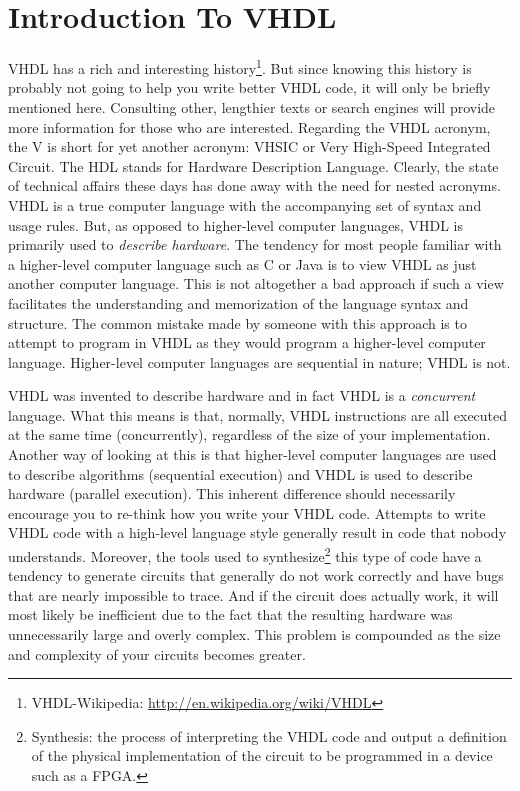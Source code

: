 %
%
%
\chapter{Introduction To VHDL}
VHDL has a rich and interesting history\footnote{VHDL-Wikipedia: {\footnotesize\url{http://en.wikipedia.org/wiki/VHDL}}}. But since knowing this history is probably not going to help you write better VHDL code, it will only be briefly mentioned here. Consulting other, lengthier texts or search engines will provide more information for those who are interested. Regarding the VHDL acronym,  the V is short for yet another acronym: VHSIC or Very High-Speed Integrated Circuit. The HDL stands for Hardware Description Language. Clearly, the state of technical affairs these days has done away with the need for nested acronyms. VHDL is a true computer language with the accompanying set of syntax and usage rules. But, as opposed to higher-level computer languages, VHDL is primarily used  to \textit{describe hardware}. The tendency for most people familiar with a higher-level computer language such as C or Java is to view VHDL as just another computer language. This is not altogether a bad approach if such a view facilitates the understanding and memorization of the language syntax and structure. The common mistake made by someone with this approach is to attempt to program in VHDL as they would program a higher-level computer language. Higher-level computer languages are sequential in nature; VHDL is not. 

VHDL was invented to describe hardware and in fact VHDL is a \textit{concurrent} language. What this means is that, normally, VHDL instructions are all executed at the same time (concurrently), regardless of the size of your implementation. Another way of looking at this is that higher-level computer languages are used to describe algorithms (sequential execution) and VHDL is used to describe hardware (parallel execution). This inherent difference should necessarily encourage you to re-think how you write your VHDL code. Attempts to write VHDL code with a high-level language style generally result in code that nobody understands. Moreover, the tools used to synthesize\footnote{Synthesis: the process of interpreting the VHDL code and output a definition of the physical implementation of the circuit to be programmed in a device such as a FPGA.} this type of code have a tendency to generate circuits that generally do not work correctly and have bugs that are nearly impossible to trace. And if the circuit does actually work, it will most likely be inefficient due to the fact that the resulting hardware was unnecessarily large and overly complex. This problem is compounded as the size and complexity of your circuits becomes greater.

